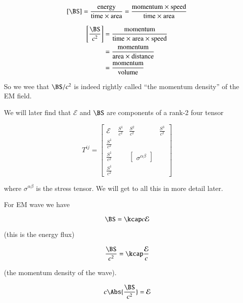 \begin{equation}\label{eqn:relativisticElectrodynamicsL17:110}
[\BS] = \frac{\text{energy}}{\text{time $\times$ area}} = \frac{\text{momentum $\times$ speed}}{\text{time $\times$ area}}
\end{equation}

\begin{align*}
\left[\frac{\BS}{c^2} \right] 
&= \frac{\text{momentum}}{\text{time $\times$ area $\times$ speed}} \\
&= \frac{\text{momentum}}{\text{area $\times$ distance}} \\
&= \frac{\text{momentum}}{\text{volume}} \\
\end{align*}

So we wee that $\BS/c^2$ is indeed rightly called ``the momentum density'' of the EM field.

We will later find that $\mathcal{E}$ and $\BS$ are components of a rank-2 four tensor

\begin{equation}\label{eqn:relativisticElectrodynamicsL17:130}
T^{ij} = 
\begin{bmatrix}
\mathcal{E} & \frac{S^1}{c^2} & \frac{S^2}{c^2} & \frac{S^3}{c^2} \\
\frac{S^1}{c^2} & & & \\
\frac{S^1}{c^2} & & 
\begin{bmatrix}
\sigma^{\alpha\beta} 
\end{bmatrix}
& \\
\frac{S^1}{c^2} & & & 
\end{bmatrix}
\end{equation}

where $\sigma^{\alpha\beta}$ is the stress tensor.  We will get to all this in more detail later.

For EM wave we have

\begin{equation}\label{eqn:relativisticElectrodynamicsL17:150}
\BS = \kcap c \mathcal{E}
\end{equation}

(this is the energy flux)

\begin{equation}\label{eqn:relativisticElectrodynamicsL17:170}
\frac{\BS}{c^2} = \kcap \frac{\mathcal{E}}{c}
\end{equation}

(the momentum density of the wave).

\begin{equation}\label{eqn:relativisticElectrodynamicsL17:190}
c \Abs{\frac{\BS}{c^2}} = \mathcal{E}
\end{equation}

